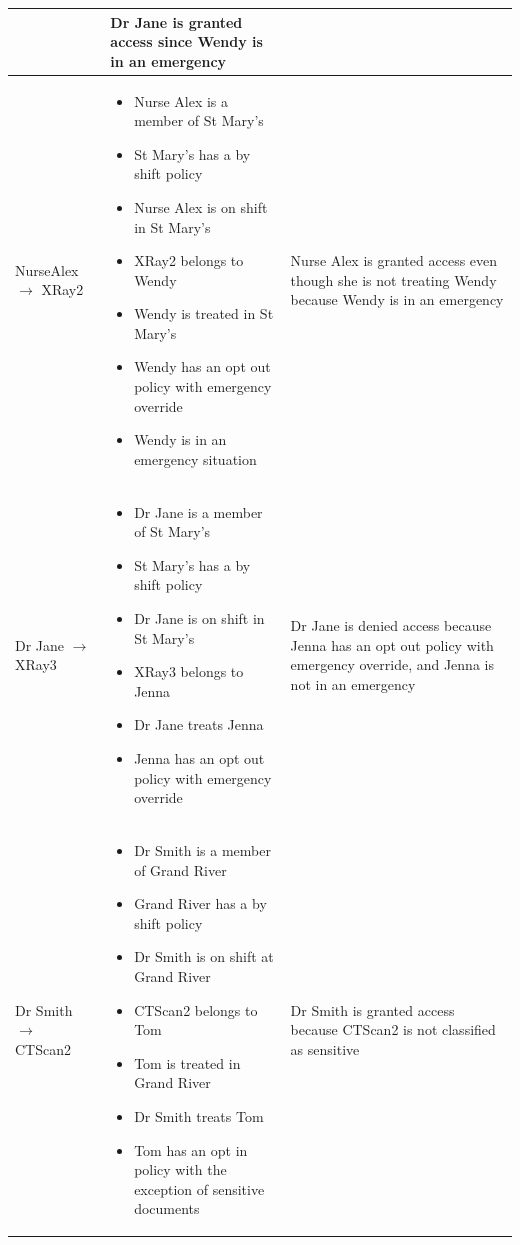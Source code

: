 \documentclass[conference]{IEEEtran}
\begin{document}
\begin{table}[!t]
{\begin{tabular}{m{3cm}|m{9cm}|m{5cm}}
\begin{itemize}
                              \end{itemize} & Dr Jane is granted access since Wendy is in an emergency\\
\hline
NurseAlex $\rightarrow$ XRay2 & \begin{itemize}
                               \item Nurse Alex is a member of St Mary's
\item St Mary's has a by shift policy
\item Nurse Alex is on shift in St Mary's
\item XRay2 belongs to Wendy
\item Wendy is treated in St Mary's
\item Wendy has an opt out policy with emergency override
\item Wendy is in an emergency situation
\end{itemize} & Nurse Alex is granted access even though she is not treating Wendy because Wendy is in an emergency\\
\hline
Dr Jane $\rightarrow$ XRay3 & \begin{itemize}
                               \item Dr Jane is a member of St Mary's
\item St Mary's has a by shift policy
\item Dr Jane is on shift in St Mary's
\item XRay3 belongs to Jenna
\item Dr Jane treats Jenna
\item Jenna has an opt out policy with emergency override \end{itemize} & Dr Jane is denied access because Jenna has an opt out policy with emergency override,
and Jenna is not in an emergency\\
\hline
Dr Smith $\rightarrow$ CTScan2 & \begin{itemize}
                                  \item Dr Smith is a member of Grand River
\item Grand River has a by shift policy
\item Dr Smith is on shift at Grand River
\item CTScan2 belongs to Tom
\item Tom is treated in Grand River
\item Dr Smith treats Tom
\item Tom has an opt in policy with the exception of sensitive documents
                                 \end{itemize} & Dr Smith is granted access because CTScan2 is not classified as sensitive\\

\end{tabular}}
\end{table}
\end{document}
